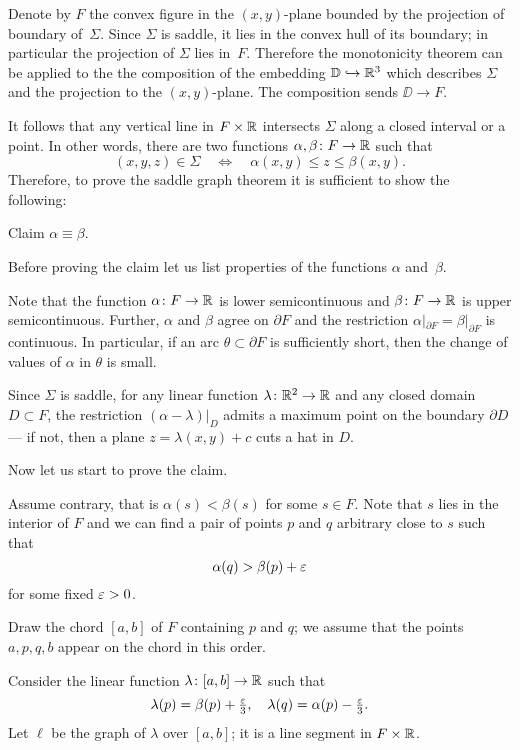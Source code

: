 \documentclass{article}
\begin{document}
Denote by $F$ the convex figure in the $(x,y)$-plane bounded by the projection of boundary of~$\Sigma$.
Since $\Sigma$ is saddle, it lies in the convex hull of its boundary;
in particular the projection of $\Sigma$ lies in~$F$.
Therefore the monotonicity theorem can be applied to the
the composition of the embedding $\mathbb{D}\hookrightarrow \mathbb{R}^3$ which describes $\Sigma$ and the projection
to the $(x,y)$-plane. The composition sends $\DD\to F$.

It follows that any vertical line in $F\times \mathbb{R}$ intersects $\Sigma$ along a closed interval or a point.
In other words, there are two functions $\alpha,\beta\colon F\to \mathbb{R}$
such that 
\[(x,y,z)\in \Sigma
\quad\iff\quad
\alpha(x,y)\le z\le \beta(x,y).\]
Therefore, to prove the saddle graph theorem it is sufficient to show the following:

\begin{thm}{Claim}
$\alpha\equiv \beta$.
\end{thm}

Before proving the claim let us list properties of the functions $\alpha$ and~$\beta$. 

Note that the function $\alpha\colon F\to \mathbb{R}$ is lower semicontinuous
and $\beta\colon F\to \mathbb{R}$ is upper semicontinuous.
Further, $\alpha$ and $\beta$ agree on $\partial F$ and the 
restriction $\alpha|_{\partial F}=\beta|_{\partial F}$ is continuous.
In particular, if an arc $\theta\subset \partial F$ is sufficiently short, then
the change of values of $\alpha$ in $\theta$ is small.

Since $\Sigma$ is saddle, for any linear function $\lambda\colon\mathbb{R}^2\to\mathbb{R}$ and any closed domain $D\subset F$, 
the restriction $(\alpha-\lambda)|_D$ admits a maximum point on the boundary $\partial D$ --- if not, then a plane $z=\lambda(x,y)+c$ cuts a hat in $D$.

Now let us start to prove the claim.

Assume contrary, that is $\alpha(s)<\beta(s)$ for some $s\in F$.
Note that $s$ lies in the interior of $F$ and we can find a pair of points $p$ and $q$ arbitrary close to $s$
such that 
\[\alpha(q)>\beta(p)+\varepsilon\]
for some fixed $\varepsilon>0$.

Draw the chord $[a,b]$ of $F$ containing $p$ and $q$;
we assume that the points $a,p,q,b$ appear on the chord in this order.

Consider the linear function $\lambda\colon[a,b]\to \mathbb{R}$ such that 
\[\lambda(p)=\beta(p)+\tfrac{\varepsilon}3,\quad\lambda(q)=\alpha(p)-\tfrac{\varepsilon}3.\]
Let $\ell$ be the graph of $\lambda$ over $[a,b]$; it is a line segment in $F\times \mathbb{R}$.
\end{document}
